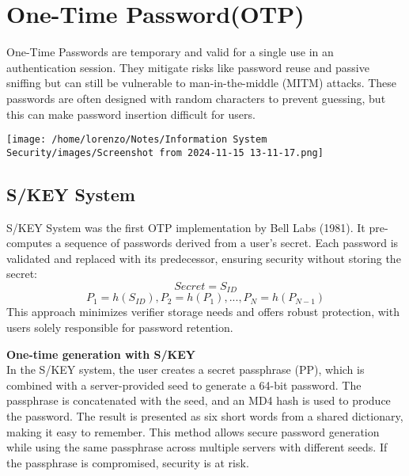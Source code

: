 \section{One-Time Password(OTP)}
\begin{minipage}{0.6\textwidth}
\vspace{-1.0cm}
One-Time Passwords are temporary and valid for a single use in an authentication session. They mitigate risks like password reuse and passive sniffing but can still be vulnerable to man-in-the-middle (MITM) attacks. These passwords are often designed  with random characters to prevent guessing, but this can make password insertion difficult for users. 
\end{minipage} 
\hspace{0.5cm}
\begin{minipage}{0.4\textwidth}
    
    \texttt{[image: /home/lorenzo/Notes/Information System Security/images/Screenshot from 2024-11-15 13-11-17.png]}
\end{minipage}

\subsection{S/KEY System}
S/KEY System was the first OTP implementation by Bell Labs (1981).
It pre-computes a sequence of passwords derived from a user’s secret. 
Each password is validated and replaced with its predecessor, ensuring security 
without storing the secret:
\[Secret = S_{ID}\]
\[P_1=h(S_{ID}),P_2=h(P_1),...,P_N=h(P_{N-1})\]
\noindent
This approach minimizes verifier storage needs and offers robust protection, with users solely responsible for password retention.\\
\begin{customquote}
    \textbf{One-time generation with S/KEY}
    \\In the S/KEY system, the user creates 
    a secret passphrase (PP), which is combined 
    with a server-provided seed to generate a 64-bit 
    password. The passphrase is concatenated with the seed, 
    and an MD4 hash is used to produce the password. 
    The result is presented as six short words from a shared 
    dictionary, making it easy to remember. This method allows secure password generation while using the same passphrase across multiple servers with different seeds. If the passphrase is compromised, security is at risk.
\end{customquote}



